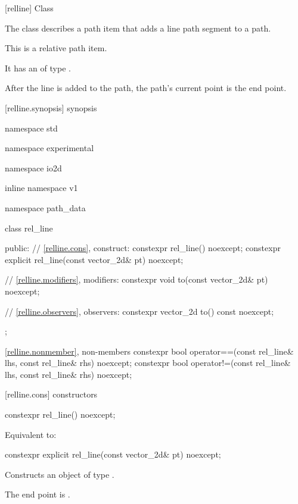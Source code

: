  [relline] {Class }%

\pnum
{}%
The class  describes a path item that adds a line path segment to a path.

\pnum
This is a relative path item.

\pnum
It has an  of type .

\pnum
After the line is added to the path, the path's current point is the end point.

 [relline.synopsis] { synopsis}

\begin{codeblock}
namespace std { namespace experimental { namespace io2d { inline namespace v1 {
  namespace path_data {
    class rel_line {
    public:
      // \ref{relline.cons}, construct:
      constexpr rel_line() noexcept;
      constexpr explicit rel_line(const vector_2d& pt) noexcept;

      // \ref{relline.modifiers}, modifiers:
      constexpr void to(const vector_2d& pt) noexcept;

      // \ref{relline.observers}, observers:
      constexpr vector_2d to() const noexcept;
    };
    
    \ref{relline.nonmember}, non-members
    constexpr bool operator==(const rel_line& lhs, const rel_line& rhs) 
      noexcept;
    constexpr bool operator!=(const rel_line& lhs, const rel_line& rhs) 
      noexcept;
  }
} } } }
\end{codeblock}

 [relline.cons] { constructors}%

%
\begin{itemdecl}
constexpr rel_line() noexcept;
\end{itemdecl}
\begin{itemdescr}
\pnum
\effects
Equivalent to: 
\end{itemdescr}

%
\begin{itemdecl}
constexpr explicit rel_line(const vector_2d& pt) noexcept;
\end{itemdecl}
\begin{itemdescr}
\pnum
\effects
Constructs an object of type .

\pnum
The end point is .
\end{itemdescr}

